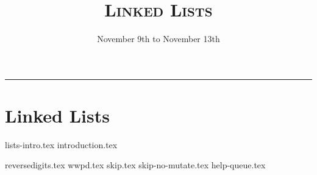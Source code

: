\documentclass{exam}
\title{\textsc{Linked Lists}}
\date{November 9th to November 13th}
\begin{document}
\maketitle
\rule{\textwidth}{0.15em}
\fontsize{12}{15}\selectfont


\section{Linked Lists}
{lists-intro.tex}
{introduction.tex}
\begin{questions}
{reversedigits.tex}
{wwpd.tex}
\newpage
{skip.tex}
{skip-no-mutate.tex}
\newpage
{help-queue.tex}
\end{questions}
\end{document}
